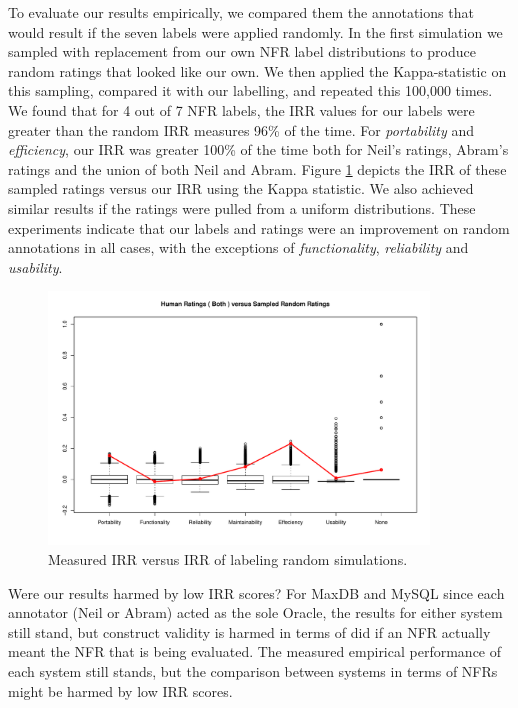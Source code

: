 \documentclass[smallextended]{svjour3}       %
\begin{document}
To evaluate our results empirically, we compared them the annotations that would result if the seven labels
 were applied randomly. In the first simulation
we sampled with replacement from our own NFR label distributions to
produce random ratings that looked like our own. We then applied the
Kappa-statistic on this sampling, compared it with our labelling, and repeated
this 100,000 times. We found that
for 4 out of 7 NFR labels, the IRR values for our labels were greater than the random
IRR measures 96\% of the time. For \emph{portability} and \emph{efficiency}, our IRR
was greater 100\% of the time both for Neil's ratings, Abram's ratings
and the union of both Neil and Abram. Figure \ref{fig:irr} depicts the IRR of
these sampled ratings versus our IRR using the Kappa statistic. We also achieved similar results if the ratings were pulled from a
uniform distributions. These experiments indicate that our labels and
ratings were an improvement on random annotations in all cases, with the exceptions of \emph{functionality},
\emph{reliability} and \emph{usability}. 

\begin{figure}
  \centering
  \includegraphics[width=0.9\textwidth]{figures/self-sample-Both}
  \caption{Measured IRR versus IRR of labeling random simulations.}
  \label{fig:irr}
\end{figure}

Were our results harmed by low IRR scores? For MaxDB and MySQL since
each annotator (Neil or Abram) acted as the sole Oracle, the results
for either system still stand, but construct validity is harmed in
terms of did if an NFR actually meant the NFR that is being
evaluated. The measured empirical performance of each system still
stands, but the comparison between systems in terms of NFRs might be
harmed by low IRR scores.
\end{document}
